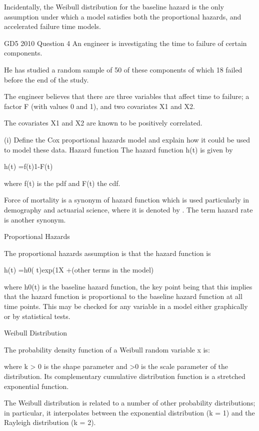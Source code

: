 Incidentally, the Weibull distribution for the baseline hazard is the only assumption under which a model satisfies both the proportional hazards, and accelerated failure time models.
 


GD5 2010 Question 4
An engineer is investigating the time to failure of certain components.
 
He has studied a random sample of 50 of these components of which 18 failed before the end of the study.
 
The engineer believes that there are three variables that affect time to failure; a factor F (with values 0 and 1), and two covariates X1 and X2.
 
The covariates X1 and X2 are known to be positively correlated.
 
(i)  Define the Cox proportional hazards model and explain how it could be used to model these data.
Hazard function
The hazard function h(t) is given by

h(t) =f(t)1-F(t)

where  f(t) is the pdf and  F(t) the cdf.  

Force of mortality is a synonym of hazard function which is used particularly in demography and actuarial science, where it is denoted by . The term hazard rate is another synonym.

Proportional Hazards


The proportional hazards assumption is that the hazard function is

h(t) =h0( t)exp(1X +(other terms in the model)

where h0(t) is the baseline hazard function, the key point being that this implies that the hazard function is proportional to the baseline hazard function at all time points.  This may be checked for any variable in a model either graphically or by statistical tests.

Weibull Distribution

The probability density function of a Weibull random variable x is:


where k > 0 is the shape parameter and  >0 is the scale parameter of the distribution. Its complementary cumulative distribution function is a stretched exponential function. 

The Weibull distribution is related to a number of other probability distributions; in particular, it interpolates between the exponential distribution (k = 1) and the Rayleigh distribution (k = 2).

